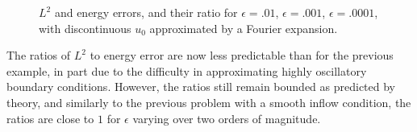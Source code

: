 \begin{figure}[h!]
\centering
{}
\caption{$L^2$ and energy errors, and their ratio for $\epsilon=.01$, $\epsilon=.001$, $\epsilon=.0001$, with discontinuous $u_0$ approximated by a Fourier expansion. }
\label{disc_sol_fourier}
\end{figure}

The ratios of $L^2$ to energy error are now less predictable than for the previous example, in part due to the difficulty in approximating highly oscillatory boundary conditions. However, the ratios still remain bounded as predicted by theory, and similarly to the previous problem with a smooth inflow condition, the ratios are close to $1$ for $\epsilon$ varying over two orders of magnitude. 

